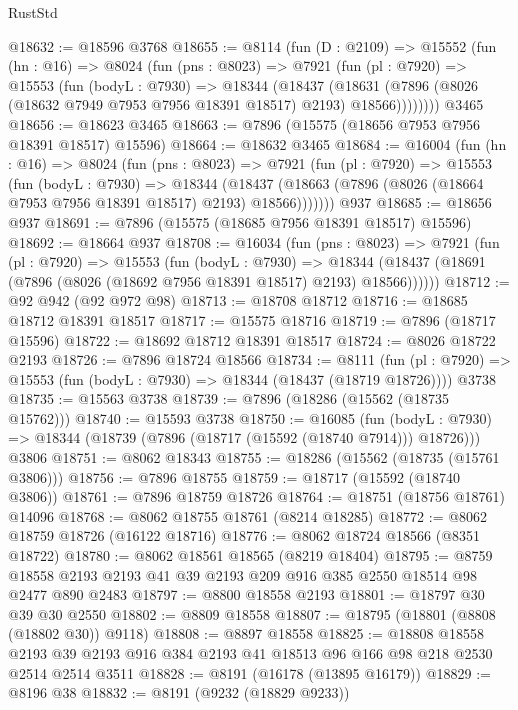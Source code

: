 \begin{lexlean}{RustStd}
\begin{coremodule}
@18632 := @18596 @3768
@18655 := @8114
    (fun (D : @2109) =>
    @15552
      (fun (hn : @16) =>
      @8024
        (fun (pns : @8023) =>
        @7921
          (fun (pl : @7920) =>
          @15553
            (fun (bodyL : @7930) =>
            @18344
              (@18437
                (@18631 (@7896 (@8026 (@18632 @7949 @7953 @7956 @18391 @18517) @2193) @18566))))))))
    @3465
@18656 := @18623 @3465
@18663 := @7896 (@15575 (@18656 @7953 @7956 @18391 @18517) @15596)
@18664 := @18632 @3465
@18684 := @16004
    (fun (hn : @16) =>
    @8024
      (fun (pns : @8023) =>
      @7921
        (fun (pl : @7920) =>
        @15553
          (fun (bodyL : @7930) =>
          @18344
            (@18437 (@18663 (@7896 (@8026 (@18664 @7953 @7956 @18391 @18517) @2193) @18566)))))))
    @937
@18685 := @18656 @937
@18691 := @7896 (@15575 (@18685 @7956 @18391 @18517) @15596)
@18692 := @18664 @937
@18708 := @16034
    (fun (pns : @8023) =>
    @7921
      (fun (pl : @7920) =>
      @15553
        (fun (bodyL : @7930) =>
        @18344 (@18437 (@18691 (@7896 (@8026 (@18692 @7956 @18391 @18517) @2193) @18566))))))
@18712 := @92 @942 (@92 @972 @98)
@18713 := @18708 @18712
@18716 := @18685 @18712 @18391 @18517
@18717 := @15575 @18716
@18719 := @7896 (@18717 @15596)
@18722 := @18692 @18712 @18391 @18517
@18724 := @8026 @18722 @2193
@18726 := @7896 @18724 @18566
@18734 := @8111
    (fun (pl : @7920) => @15553 (fun (bodyL : @7930) => @18344 (@18437 (@18719 @18726))))
    @3738
@18735 := @15563 @3738
@18739 := @7896 (@18286 (@15562 (@18735 @15762)))
@18740 := @15593 @3738
@18750 := @16085
    (fun (bodyL : @7930) => @18344 (@18739 (@7896 (@18717 (@15592 (@18740 @7914))) @18726)))
    @3806
@18751 := @8062 @18343
@18755 := @18286 (@15562 (@18735 (@15761 @3806)))
@18756 := @7896 @18755
@18759 := @18717 (@15592 (@18740 @3806))
@18761 := @7896 @18759 @18726
@18764 := @18751 (@18756 @18761) @14096
@18768 := @8062 @18755 @18761 (@8214 @18285)
@18772 := @8062 @18759 @18726 (@16122 @18716)
@18776 := @8062 @18724 @18566 (@8351 @18722)
@18780 := @8062 @18561 @18565 (@8219 @18404)
@18795 := @8759 @18558 @2193 @2193 @41 @39 @2193 @209 @916 @385 @2550 @18514 @98 @2477 @890 @2483
@18797 := @8800 @18558 @2193
@18801 := @18797 @30 @39 @30 @2550
@18802 := @8809 @18558
@18807 := @18795 (@18801 (@8808 (@18802 @30)) @9118)
@18808 := @8897 @18558
@18825 := @18808
    @18558
    @2193
    @39
    @2193
    @916
    @384
    @2193
    @41
    @18513
    @96
    @166
    @98
    @218
    @2530
    @2514
    @2514
    @3511
@18828 := @8191 (@16178 (@13895 @16179))
@18829 := @8196 @38
@18832 := @8191 (@9232 (@18829 @9233))

\end{coremodule}
\end{lexlean}
